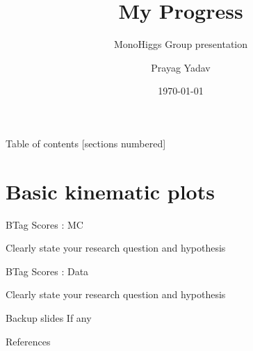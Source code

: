 \documentclass[10pt,xcolor=dvipsnames]{beamer}
\title{My Progress}
\subtitle{MonoHiggs Group presentation}
\date{\today}
\author{Prayag Yadav}
\institute{University of Hyderabad}
\begin{document}
\maketitle

\begin{frame}{Table of contents}
  [sections numbered]
  \tableofcontents%
\end{frame}

\section[Basic kinematic plots without selections, corrections and Scale Factors ]{Basic kinematic plots }

\begin{frame}[fragile]{BTag Scores : MC }

Clearly state your research question and hypothesis\cite{griffiths}
  
\end{frame}


\begin{frame}[fragile]{BTag Scores : Data}

Clearly state your research question and hypothesis
  
\end{frame}

\appendix

\begin{frame}[fragile]{Backup slides}
  If any
\end{frame}

\begin{frame}[allowframebreaks]{References}

  
  

\end{frame}
\end{document}

